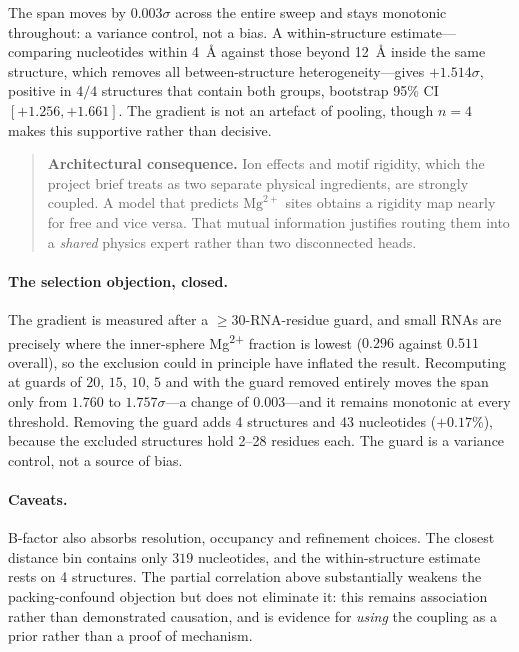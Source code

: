 \documentclass[11pt,a4paper]{article}
\begin{document}
\noindent The span moves by $0.003\sigma$ across the entire sweep and stays
monotonic throughout: a variance control, not a bias.
A within-structure estimate---comparing nucleotides within 4~\AA{} against those
beyond 12~\AA{} inside the same structure, which removes all between-structure
heterogeneity---gives $+1.514\sigma$, positive in $4/4$ structures that contain
both groups, bootstrap 95\% CI $[+1.256, +1.661]$. The gradient is not an
artefact of pooling, though $n=4$ makes this supportive rather than decisive.

\begin{quote}
\textbf{Architectural consequence.} Ion effects and motif rigidity, which the
project brief treats as two separate physical ingredients, are strongly coupled.
A model that predicts $\mathrm{Mg}^{2+}$ sites obtains a rigidity map nearly for
free and vice versa. That mutual information justifies routing them into a
\emph{shared} physics expert rather than two disconnected heads.
\end{quote}

\paragraph{The selection objection, closed.} The gradient is measured after a
$\geq 30$-RNA-residue guard, and small RNAs are precisely where the inner-sphere
Mg\textsuperscript{2+} fraction is lowest ($0.296$ against $0.511$ overall), so
the exclusion could in principle have inflated the result. Recomputing at guards
of $20$, $15$, $10$, $5$ and with the guard removed entirely moves the span only
from $1.760$ to $1.757\sigma$---a change of $0.003$---and it remains monotonic at
every threshold. Removing the guard adds 4 structures and 43 nucleotides
($+0.17\%$), because the excluded structures hold 2--28 residues each. The guard
is a variance control, not a source of bias.

\paragraph{Caveats.} B-factor also absorbs resolution, occupancy and refinement
choices. The closest distance bin contains only $319$ nucleotides, and the
within-structure estimate rests on 4 structures. The partial correlation above
substantially weakens the packing-confound objection but does not eliminate it:
this remains association rather than demonstrated causation, and is evidence for
\emph{using} the coupling as a prior rather than a proof of mechanism.
\end{document}
